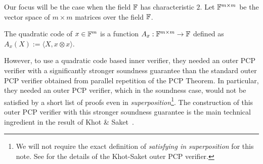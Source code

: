 Our focus will be the case when the field $\mathbb F$ has characteristic $2$. 
Let $\mathbb F^{m\times m}$ be the vector space of $m\times m$ matrices over
the field $\mathbb F$.
\begin{definition}
The quadratic code of $x \in \mathbb F^m$ is a function $A_x:\mathbb F^{m\times m} \rightarrow \mathbb F$ defined as $A_x(X):= \langle X, x\otimes x \rangle$. 
\end{definition}

  
    However, to use a quadratic code based
inner verifier, they needed an outer PCP verifier with a significantly
stronger soundness guarantee than the standard outer PCP verifier
obtained from parallel repetition of the PCP Theorem. In particular,
they needed an outer PCP verifier, which in the soundness case, would
not be satisfied by a short list of proofs even in {\em
  superposition}\footnote{We will not require the exact definition of
  {\em satisfying in superposition} for this note. See
   for the details of the Khot-Saket outer PCP
  verifier.}. The construction of this outer PCP verifier with this
stronger soundness guarantee is the main technical ingredient in the
result of Khot
\& Saket~\cite{KhotS2014b}.


